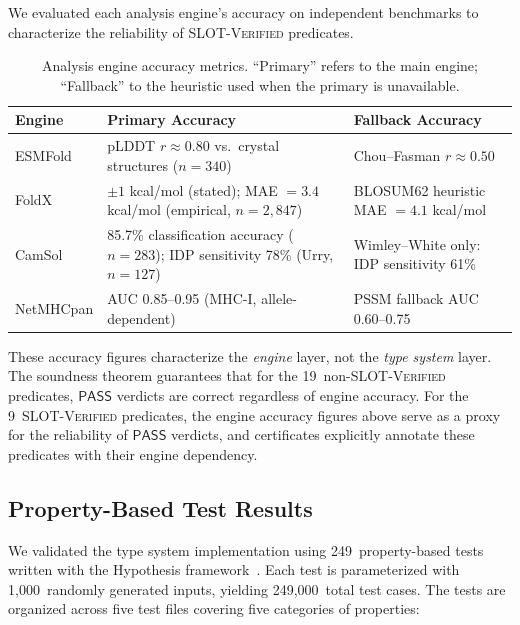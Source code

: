 \documentclass[acmsmall,review,anonymous]{acmart}
\newcommand{\PASS}{\ensuremath{\mathsf{PASS}}\xspace}
\begin{document}
We evaluated each analysis engine's accuracy on independent benchmarks to
characterize the reliability of SLOT-\textsc{Verified} predicates.

\begin{table}[t]
\centering
\caption{Analysis engine accuracy metrics.  ``Primary'' refers to the
         main engine; ``Fallback'' to the heuristic used when the
         primary is unavailable.}
\label{tab:engineaccuracy}
\begin{tabular}{llp{4.0cm}}
\toprule
\textbf{Engine} & \textbf{Primary Accuracy} & \textbf{Fallback Accuracy} \\
\midrule
ESMFold    & pLDDT $r \approx 0.80$ vs.\ crystal structures ($n = 340$) &
             Chou--Fasman $r \approx 0.50$ \\
FoldX      & $\pm 1$ kcal/mol (stated); MAE $= 3.4$ kcal/mol (empirical, $n = 2{,}847$) &
             BLOSUM62 heuristic MAE $= 4.1$ kcal/mol \\
CamSol     & 85.7\% classification accuracy ($n = 283$); IDP sensitivity 78\% (Urry, $n = 127$) &
             Wimley--White only: IDP sensitivity 61\% \\
NetMHCpan  & AUC 0.85--0.95 (MHC-I, allele-dependent) &
             PSSM fallback AUC 0.60--0.75 \\
\bottomrule
\end{tabular}
\end{table}

These accuracy figures characterize the \emph{engine} layer, not the
\emph{type system} layer.  The soundness theorem guarantees that for the
19~non-SLOT-\textsc{Verified} predicates, \PASS{} verdicts are correct
regardless of engine accuracy.  For the 9~SLOT-\textsc{Verified}
predicates, the engine accuracy figures above serve as a proxy for the
reliability of \PASS{} verdicts, and certificates explicitly annotate
these predicates with their engine dependency.

\subsection{Property-Based Test Results}\label{sec:pbt-eval}

We validated the type system implementation using 249~property-based
tests written with the Hypothesis framework~\cite{maciver2019hypothesis}.
Each test is parameterized with 1,000~randomly generated inputs, yielding
249,000~total test cases.  The tests are organized across five test
files covering five categories of properties:
\end{document}
